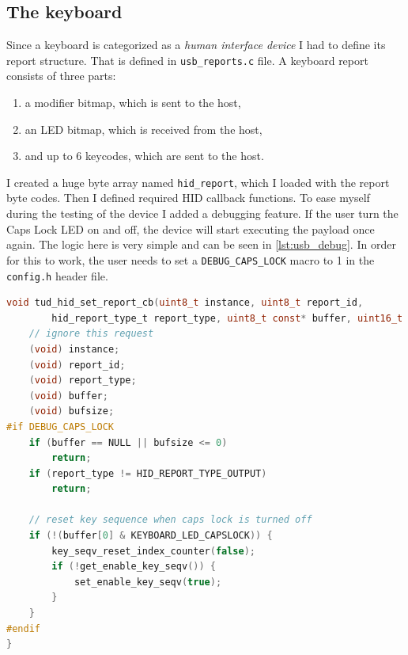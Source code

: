 \subsection{The keyboard}
Since a keyboard is categorized as a \emph{human interface device} I had to define its report structure. That is defined in \verb|usb_reports.c| file. A keyboard report consists of three parts:
\begin{enumerate}
    \item a modifier bitmap, which is sent to the host,
    \item an LED bitmap, which is received from the host,
    \item and up to 6 keycodes, which are sent to the host.
\end{enumerate}
I created a huge byte array named \verb|hid_report|, which I loaded with the report byte codes. Then I defined required HID callback functions. To ease myself during the testing of the device I added a debugging feature. If the user turn the Caps Lock LED on and off, the device will start executing the payload once again. The logic here is very simple and can be seen in \autoref{lst:usb_debug}. In order for this to work, the user needs to set a \verb|DEBUG_CAPS_LOCK| macro to 1 in the \verb|config.h| header file.

\begin{lstlisting}[caption={A snippet of code which implements the payload re-execution.},
                   label={lst:usb_debug},
                   language=c]
void tud_hid_set_report_cb(uint8_t instance, uint8_t report_id,
        hid_report_type_t report_type, uint8_t const* buffer, uint16_t bufsize) {
    // ignore this request
    (void) instance;
    (void) report_id;
    (void) report_type;
    (void) buffer;
    (void) bufsize;
#if DEBUG_CAPS_LOCK
    if (buffer == NULL || bufsize <= 0)
        return;
    if (report_type != HID_REPORT_TYPE_OUTPUT)
        return;

    // reset key sequence when caps lock is turned off
    if (!(buffer[0] & KEYBOARD_LED_CAPSLOCK)) {
        key_seqv_reset_index_counter(false);
        if (!get_enable_key_seqv()) {
            set_enable_key_seqv(true);
        }
    }
#endif
}
\end{lstlisting}

